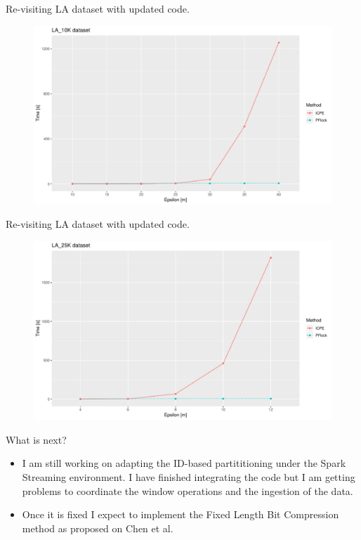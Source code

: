 \documentclass{beamer}
\begin{document}
\begin{frame}{Re-visiting LA dataset}
    {\small with updated code.}
    \centering
    \begin{figure}
        \includegraphics[width=.9\textwidth]{ICPE_10K}
    \end{figure}    
\end{frame}

\begin{frame}{Re-visiting LA dataset}
    {\small with updated code.}
    \centering
    \begin{figure}
        \includegraphics[width=.9\textwidth]{ICPE_25K}
    \end{figure}    
\end{frame}

\begin{frame}{What is next?}
    \begin{itemize}
        \item I am still working on adapting the ID-based partititioning under the Spark Streaming environment. I have finished integrating the code but I am getting problems to coordinate the window operations and the ingestion of the data.
        
        \item Once it is fixed I expect to implement the Fixed Length Bit Compression method as proposed on Chen et al.
    \end{itemize}
\end{frame}
\end{document}
